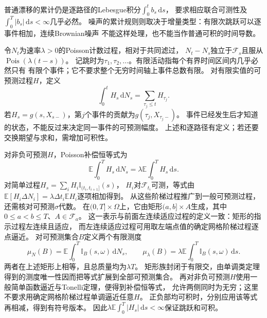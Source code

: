 普通漂移的累计仍是逐路径的Lebesgue积分$\int_0^t b_s\,\mathrm ds$，
要求相应联合可测性及$\int_0^T|b_s|\,\mathrm ds<\infty$几乎必然。
噪声的累计规则则取决于增量类型：有限次跳跃可以逐事件相加，连续Brownian噪声
不能这样处理，也不能当作普通可积的时间导数。

令$N_t$为速率$\lambda>0$的Poisson计数过程，相对于共同滤过，
$N_t-N_s$独立于$\mathcal F_s$且服从$\operatorname{Pois}(\lambda(t-s))$。
记跳时为$\tau_1,\tau_2,\ldots$。有限活动指每个有界时间区间内几乎必然只有
有限个事件；它不要求整个无穷时间轴上事件总数有限。
对有限实值的可预测过程$H$，定义
\begin{equation}
  \int_0^t H_s\,\mathrm dN_s
    =\sum_{\tau_j\leq t}H_{\tau_j}.
  \label{eq:action-state-poisson-integral}
\end{equation}
若$H_s=g(s,X_{s-})$，第$j$个事件的贡献为$g(\tau_j,X_{\tau_j-})$。
事件已经发生后才知道的状态，不能反过来决定同一事件的可预测幅度。
上述和逐路径有定义；若还要交换期望与求和，需增加可积性。

对非负可预测$H$，Poisson补偿恒等式为
\[
  \mathbb E\int_0^T H_s\,\mathrm dN_s
       =\lambda\mathbb E\int_0^T H_s\,\mathrm ds.
\]
对简单过程$H_s=\sum_iH_i\mathbb I_{(t_i,t_{i+1}]}(s)$，
$H_i$对$\mathcal F_{t_i}$可测，等式由
$\mathbb E[H_i\Delta N_i]=\lambda\Delta t_i\mathbb E H_i$逐项相加得到。
从这些阶梯过程推广到一般可预测过程，还需核对可预测$\sigma$代数。
在$(0,T]\times\Omega$上，它由矩形$(a,b]\times A$生成，其中
$0\leq a<b\leq T$、$A\in\mathcal F_a$。
这一表示与前面左连续适应过程的定义一致：矩形的指示过程左连续且适应，
而左连续适应过程可用取左端点值的确定网格阶梯过程逐点逼近。
对可预测集合$B$定义两个有限测度
\[
 \mu_N(B)=\mathbb E\int_0^T\mathbb I_B(s,\omega)\,\mathrm dN_s,
 \qquad
 \mu_\lambda(B)=\lambda\mathbb E\int_0^T\mathbb I_B(s,\omega)\,\mathrm ds.
\]
两者在上述矩形上相等，且总质量均为$\lambda T$。
矩形族封闭于有限交，由单调类定理得到的测度唯一性因而把等式扩展到全部可预测集合。
再对非负可预测$H$使用一般简单函数逼近与Tonelli定理，便得到补偿恒等式，
允许两侧同时为无穷；这里不要求用确定网格阶梯过程单调逼近任意$H$。
正负部均可积时，分别应用该等式再相减，得到有符号版本。
因此$\lambda\mathbb E\int_0^T|H_s|\,\mathrm ds<\infty$保证跳跃和可积。

